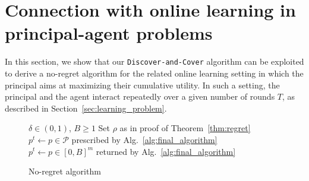 \section{Connection with online learning in principal-agent problems}\label{sec:regret}
In this section, we show that our \texttt{Discover-and-Cover} algorithm can be exploited to derive a no-regret algorithm for the related online learning setting in which the principal aims at maximizing their cumulative utility.
%
In such a setting, the principal and the agent interact repeatedly over a given number of rounds $T$, as described in Section~\ref{sec:learning_problem}.

\begin{figure}
	\vspace{-1.3cm}
	\begin{minipage}{0.44\textwidth}
		\begin{algorithm}[H]
			\caption{No-regret algorithm}
			\label{alg:regret}
			\small
			\begin{algorithmic}[1]
				\Require $\delta \in (0,1)$, $B \geq 1$  
				\State Set $\rho$ as in proof of Theorem~\ref{thm:regret}
				\State $p^t \gets p \in \mathcal{P}$ prescribed by Alg.~\ref{alg:final_algorithm}
				\Else
				\State $p^t \gets p\in [0,B]^m$ returned by Alg.~\ref{alg:final_algorithm}
				\EndIf
				\EndFor
			\end{algorithmic}
		\end{algorithm}
	\end{minipage}
\end{figure}


